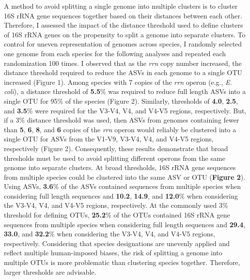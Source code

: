 \documentclass[
]{article}
\begin{document}
A method to avoid splitting a single genome into multiple clusters is to
cluster 16S rRNA gene sequences together based on their distances
between each other. Therefore, I assessed the impact of the distance
threshold used to define clusters of 16S rRNA genes on the propensity to
split a genome into separate clusters. To control for uneven
representation of genomes across species, I randomly selected one genome
from each species for the following analyses and repeated each
randomization 100 times. I observed that as the \emph{rrn} copy number
increased, the distance threshold required to reduce the ASVs in each
genome to a single OTU increased (Figure 1). Among species with 7 copies
of the \emph{rrn} operon (e.g., \emph{E. coli}), a distance threshold of
\textbf{5.5}\% was required to reduce full length ASVs into a single OTU
for 95\% of the species (Figure 2). Similarly, thresholds of
\textbf{4.0}, \textbf{2.5}, and \textbf{3.5}\% were required for the
V3-V4, V4, and V4-V5 regions, respectively. But, if a 3\% distance
threshold was used, then ASVs from genomes containing fewer than
\textbf{5}, \textbf{6}, \textbf{8}, and \textbf{6} copies of the
\emph{rrn} operon would reliably be clustered into a single OTU for ASVs
from the V1-V9, V3-V4, V4, and V4-V5 regions, respectively (Figure 2).
Consequently, these results demonstrate that broad thresholds must be
used to avoid splitting different operons from the same genome into
separate clusters. At broad thresholds, 16S rRNA gene sequences from
multiple species could be clustered into the same ASV or OTU
(\textbf{Figure 2}). Using ASVs, \textbf{3.6}\% of the ASVs contained
sequences from multiple species when considering full length sequences
and \textbf{10.2}, \textbf{14.9}, and \textbf{12.0}\% when considering
the V3-V4, V4, and V4-V5 regions, respectively. At the commonly used 3\%
threshold for defining OTUs, \textbf{25.2}\% of the OTUs contained 16S
rRNA gene sequences from multiple species when considering full length
sequences and \textbf{29.4}, \textbf{33.0}, and \textbf{32.2}\% when
considering the V3-V4, V4, and V4-V5 regions, respectively. Considering
that species designations are unevenly applied and reflect multiple
human-imposed biases, the risk of splitting a genome into multiple OTUs
is more problematic than clustering species together. Therefore, larger
thresholds are advisable.
\end{document}
